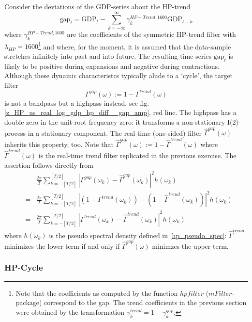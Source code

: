 \documentclass[a4paper]{book}
\begin{document}
Consider the deviations of the GDP-series about the HP-trend 
\[
\textrm{gap}_t=\textrm{GDP}_t-\sum_{k=-\infty}^{\infty}{\gamma}_k^{HP-Trend,1600} \textrm{GDP}_{t-k}
\]
where ${\gamma}_k^{HP-Trend,1600}$ are the coefficients of the symmetric HP-trend filter with $\lambda_{HP}=1600$\footnote{Note that the coefficients as computed by the function $hpfilter$ ($mFilter$-package) correspond to the gap. The trend coefficients in the previous section were obtained by the transformation $\gamma_k^{trend}=1-\gamma_k^{gap}$.} and where, for the moment, it is assumed that the data-sample stretches infinitely into past and into future. The resulting time series $\textrm{gap}_t$ is likely to be positive during expansions and negative during contractions. Although these dynamic characteristcs typically alude to a `cycle', the target filter 
\[\Gamma^{gap}(\omega):=1-\Gamma^{trend}(\omega)\]
is not a bandpass but a highpass instead, see fig.\ref{z_HP_us_real_log_gdp_hp_diff__gap_amp}, red line. The highpass has a double zero in the unit-root frequency zero: it transforms a non-stationary I(2)-process in a stationary component. The real-time (one-sided) filter $\hat{\Gamma}^{gap}(\omega)$ inherits this property, too. Note that $\hat{\Gamma}^{gap}(\omega):=1-\hat{\Gamma}^{trend}(\omega)$ where $\hat{\Gamma}^{trend}(\omega)$ is the real-time trend filter replicated in the previous exercise. The assertion follows directly from
\begin{eqnarray*}
&&\frac{2\pi}{T}\sum_{k=-[T/2]}^{[T/2]}\left|\Gamma^{gap}(\omega_k)-\hat{\Gamma}^{gap} (\omega_k)\right|^2 h(\omega_k)\\
&=&\frac{2\pi}{T}\sum_{k=-[T/2]}^{[T/2]}\left|(1-\Gamma^{trend}(\omega_k))-(1-\hat{\Gamma}^{trend} (\omega_k))\right|^2 h(\omega_k)\\
&=&\frac{2\pi}{T}\sum_{k=-[T/2]}^{[T/2]}\left|\Gamma^{trend}(\omega_k)-\hat{\Gamma}^{trend} (\omega_k)\right|^2 h(\omega_k)
\end{eqnarray*}
where $h(\omega_k)$ is the pseudo spectral density defined in \ref{hp_pseudo_spec}: $\hat{\Gamma}^{trend}$ minimizes the lower term if and only if $\hat{\Gamma}^{gap}(\omega)$ minimzes the upper term. 


\subsubsection{HP-Cycle}
\end{document}
